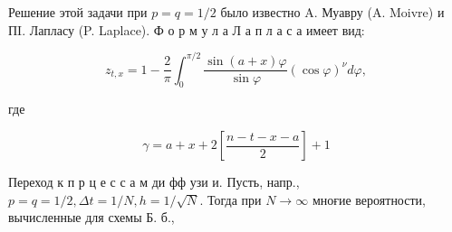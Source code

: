 \documentclass[10pt]{article}
\begin{document}
Решение этой задачи при $p=q=1 / 2$ было известно A. Муавру (A. Moivre) и ПI. Лапласу (P. Laplace). Ф о р м у л а Л а п л а с а имеет вид:



\[

z_{t, x}=1-\frac{2}{\pi} \int_{0}^{\pi / 2} \frac{\sin (a+x) \varphi}{\sin \varphi}(\cos \varphi)^{\nu} d \varphi,

\]



где



\[

\gamma=a+x+2\left[\frac{n-t-x-a}{2}\right]+1

\]



Переход к п р ц е с с а м ди фф узи и. Пусть, напр., $p=q=1 / 2, \Delta t=1 / N, h=1 / \sqrt{N}$. Тогда при $N \rightarrow \infty$ мноғие вероятности, вычисленные для схемы Б. б.,
\end{document}
